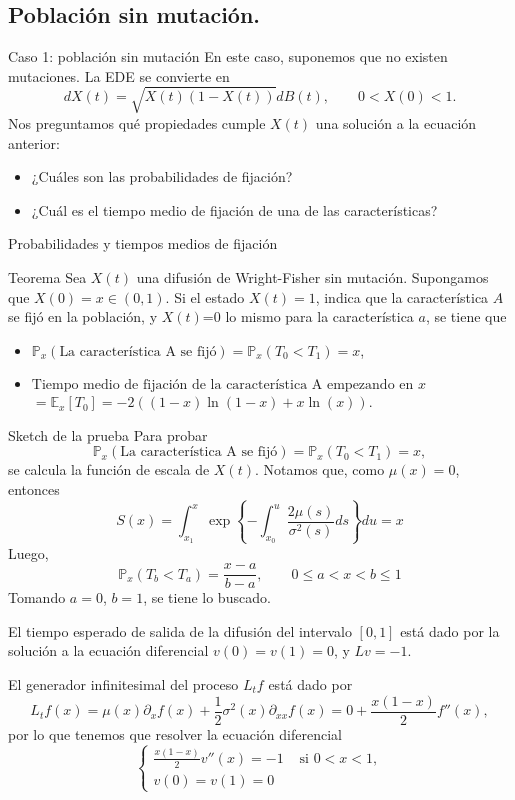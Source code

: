 \documentclass{beamer}
\newcommand{\E}{\mathbb{E}}
\renewcommand{\P}{\mathbb{P}}
\renewcommand{\1}{\mathds{1}}
\theoremstyle{definition}
\theoremstyle{definition}
\theoremstyle{definition}
\theoremstyle{definition}
\theoremstyle{definition}
\begin{document}
\subsection{Población sin mutación.}
\begin{frame}{Caso 1: población sin mutación}
    En este caso, suponemos que no existen mutaciones. La EDE se convierte en 
    \[
    dX(t)=\sqrt{X(t)(1-X(t))}dB(t), \qquad 0<X(0)<1.
    \]
    Nos preguntamos qué propiedades cumple $X(t)$ una solución a la ecuación anterior:
    \begin{itemize}
        \item ¿Cuáles son las probabilidades de fijación?
        \item ¿Cuál es el tiempo medio de fijación de una de las características?
    \end{itemize}
\end{frame}
\begin{frame}{Probabilidades y tiempos medios de fijación}
    \begin{block}{Teorema}
        Sea $X(t)$ una difusión de Wright-Fisher sin mutación. Supongamos que $X(0)=x\in (0,1)$. Si el estado $X(t)=1$, 
        indica que la característica $A$ se fijó en la población, y $X(t)$=0 lo mismo para 
        la característica $a$, se tiene que
        \begin{itemize}
            \item $\P_x(\text{La característica A se fijó})=\P_x(T_0<T_1)=x$,
            \item $\text{Tiempo medio de fijación de la característica A empezando en $x$}$\\
            $=\E_{x}\left[T_0\right]=-2((1-x)\ln(1-x)+x\ln(x))$.
        \end{itemize}
    \end{block}
\end{frame}
\begin{frame}{Sketch de la prueba}
    Para probar 
    \[
        \P_x(\text{La característica A se fijó})=\P_x(T_0<T_1)=x,
    \]
    se calcula la función de escala de $X(t)$. Notamos que, como $\mu(x)=0$, entonces 
    \[
    S(x)=\int_{x_1}^{x}\exp \left\{-\int_{x_0}^{u}\frac{2\mu(s)}{\sigma^2(s)}ds \right\} du =x  
    \]
    Luego, 
    \[
    \P_x(T_b<T_a)=\frac{x-a}{b-a}, \qquad 0\leq a<x<b\leq1    
    \]
    Tomando $a=0$, $b=1$, se tiene lo buscado.
\end{frame}
\begin{frame}
    El tiempo esperado de salida de la difusión del intervalo $[0,1]$ está dado por la solución 
    a la ecuación diferencial $v(0)=v(1)=0$, y $Lv=-1$.
    \newline

    El generador infinitesimal del proceso $L_tf$ está dado por 
    \[
        L_tf(x)=\mu(x)\partial_xf(x) +\frac{1}{2}\sigma^2(x)\partial_{xx}f(x)=0+\frac{x(1-x)}{2}f''(x),
    \]
    por lo que tenemos que resolver la ecuación diferencial 
    \[
    \begin{cases}
        \frac{x(1-x)}{2}v''(x)=-1 & \text{ si } 0<x<1,\\
        v(0)=v(1)=0 
    \end{cases}    
    \]
\end{frame}
\end{document}
